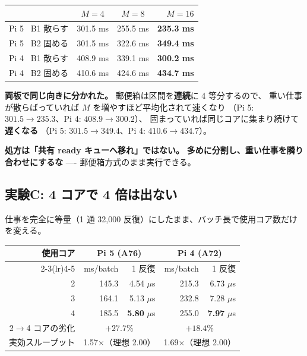 \documentclass[a4paper,11pt]{ltjsarticle}
\begin{document}
\begin{center}
\begin{tabular}{lrrrrr}
\toprule
 & \multicolumn{2}{c}{$M=4$} & \multicolumn{2}{c}{$M=8$} & $M=16$ \\
\midrule
Pi 5 \ B1 散らす & \multicolumn{2}{r}{301.5 ms} & \multicolumn{2}{r}{255.5 ms} & \textbf{235.3 ms} \\
Pi 5 \ B2 固める & \multicolumn{2}{r}{301.5 ms} & \multicolumn{2}{r}{322.6 ms} & \textbf{349.4 ms} \\
Pi 4 \ B1 散らす & \multicolumn{2}{r}{408.9 ms} & \multicolumn{2}{r}{339.1 ms} & \textbf{300.2 ms} \\
Pi 4 \ B2 固める & \multicolumn{2}{r}{410.6 ms} & \multicolumn{2}{r}{424.6 ms} & \textbf{434.7 ms} \\
\bottomrule
\end{tabular}
\end{center}

\noindent
\textbf{両板で同じ向きに分かれた。} 郵便箱は区間を\textbf{連続}に 4 等分するので、
重い仕事が散らばっていれば $M$ を増やすほど平均化されて速くなり
（Pi 5: $301.5 \to 235.3$、Pi 4: $408.9 \to 300.2$）、
固まっていれば同じコアに集まり続けて\textbf{遅くなる}
（Pi 5: $301.5 \to 349.4$、Pi 4: $410.6 \to 434.7$）。

\textbf{処方は「共有 ready キューへ移れ」ではない。}
\textbf{多めに分割し、重い仕事を隣り合わせにするな} ---- 郵便箱方式のまま実行できる。

\subsection{実験C: 4 コアで 4 倍は出ない}
仕事を完全に等量（1 通 32{,}000 反復）にしたまま、バッチ長で使用コア数だけを変える。

\begin{center}
\begin{tabular}{rrrrr}
\toprule
使用コア & \multicolumn{2}{c}{Pi 5 (A76)} & \multicolumn{2}{c}{Pi 4 (A72)} \\
\cmidrule(lr){2-3}\cmidrule(lr){4-5}
 & ms/batch & 1 反復 & ms/batch & 1 反復 \\
\midrule
2 & 145.3 & 4.54 $\mu$s & 215.3 & 6.73 $\mu$s \\
3 & 164.1 & 5.13 $\mu$s & 232.8 & 7.28 $\mu$s \\
4 & 185.5 & \textbf{5.80} $\mu$s & 255.0 & \textbf{7.97} $\mu$s \\
\midrule
2$\to$4 コアの劣化 & \multicolumn{2}{c}{\textbf{$+27.7\%$}} & \multicolumn{2}{c}{\textbf{$+18.4\%$}} \\
実効スループット & \multicolumn{2}{c}{1.57$\times$（理想 2.00）} & \multicolumn{2}{c}{1.69$\times$（理想 2.00）} \\
\bottomrule
\end{tabular}
\end{center}
\end{document}
